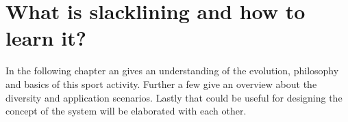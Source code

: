 \chapter{What is slacklining and how to learn it?}\label{3_slacklining}
In the following chapter an \textbf{} gives an understanding of the evolution, philosophy and basics of this sport activity. Further a few \textbf{} give an overview about the diversity and application scenarios. Lastly \textbf{} that could be useful for designing the concept of the system will be elaborated with each other.
 

 
 
 